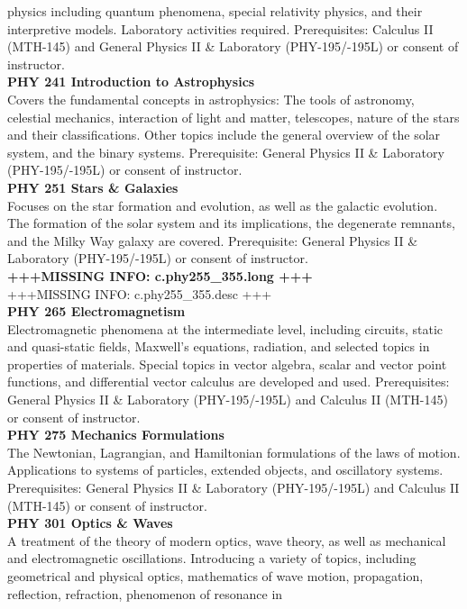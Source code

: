 \documentclass[
  letterpaper,
]{scrbook}
\begin{document}
physics including quantum phenomena, special relativity physics, and
their interpretive models. Laboratory activities required.
Prerequisites: Calculus II (MTH-145) and General Physics II \&
Laboratory (PHY-195/-195L) or consent of instructor.\\
\textbf{PHY 241 Introduction to Astrophysics}\\
Covers the fundamental concepts in astrophysics: The tools of astronomy,
celestial mechanics, interaction of light and matter, telescopes, nature
of the stars and their classifications. Other topics include the general
overview of the solar system, and the binary systems. Prerequisite:
General Physics II \& Laboratory (PHY-195/-195L) or consent of
instructor.\\
\textbf{PHY 251 Stars \& Galaxies}\\
Focuses on the star formation and evolution, as well as the galactic
evolution. The formation of the solar system and its implications, the
degenerate remnants, and the Milky Way galaxy are covered. Prerequisite:
General Physics II \& Laboratory (PHY-195/-195L) or consent of
instructor.\\
\textbf{+++MISSING INFO: c.phy255\_355.long +++}\\
+++MISSING INFO: c.phy255\_355.desc +++\\
\textbf{PHY 265 Electromagnetism}\\
Electromagnetic phenomena at the intermediate level, including circuits,
static and quasi-static fields, Maxwell's equations, radiation, and
selected topics in properties of materials. Special topics in vector
algebra, scalar and vector point functions, and differential vector
calculus are developed and used. Prerequisites: General Physics II \&
Laboratory (PHY-195/-195L) and Calculus II (MTH-145) or consent of
instructor.\\
\textbf{PHY 275 Mechanics Formulations}\\
The Newtonian, Lagrangian, and Hamiltonian formulations of the laws of
motion. Applications to systems of particles, extended objects, and
oscillatory systems. Prerequisites: General Physics II \& Laboratory
(PHY-195/-195L) and Calculus II (MTH-145) or consent of instructor.\\
\textbf{PHY 301 Optics \& Waves}\\
A treatment of the theory of modern optics, wave theory, as well as
mechanical and electromagnetic oscillations. Introducing a variety of
topics, including geometrical and physical optics, mathematics of wave
motion, propagation, reflection, refraction, phenomenon of resonance in
\end{document}
